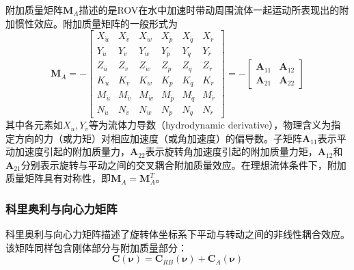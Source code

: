 附加质量矩阵$\boldsymbol{M}_A$描述的是ROV在水中加速时带动周围流体一起运动所表现出的附加惯性效应。附加质量矩阵的一般形式为
\begin{equation}
    \boldsymbol{M}_{A}=
    -\begin{bmatrix}
        X_{\dot{u}} & X_{\dot{v}} & X_{\dot{w}} & X_{\dot{p}} & X_{\dot{q}} & X_{\dot{r}} \\
        Y_{\dot{u}} & Y_{\dot{v}} & Y_{\dot{w}} & Y_{\dot{p}} & Y_{\dot{q}} & Y_{\dot{r}} \\
        Z_{\dot{u}} & Z_{\dot{v}} & Z_{\dot{w}} & Z_{\dot{p}} & Z_{\dot{q}} & Z_{\dot{r}} \\
        K_{\dot{u}} & K_{\dot{v}} & K_{\dot{w}} & K_{\dot{p}} & K_{\dot{q}} & K_{\dot{r}} \\
        M_{\dot{u}} & M_{\dot{v}} & M_{\dot{w}} & M_{\dot{p}} & M_{\dot{q}} & M_{\dot{r}} \\
        N_{\dot{u}} & N_{\dot{v}} & N_{\dot{w}} & N_{\dot{p}} & N_{\dot{q}} & N_{\dot{r}}
    \end{bmatrix}
    =
    -\begin{bmatrix}
        \boldsymbol{A}_{11} & \boldsymbol{A}_{12} \\
        \boldsymbol{A}_{21} & \boldsymbol{A}_{22}
    \end{bmatrix}
    \label{eq:M_A_full}
\end{equation}
其中各元素如$X_{\dot{u}},Y_{\dot{v}}$等为流体力导数（hydrodynamic derivative），物理含义为指定方向的力（或力矩）对相应加速度（或角加速度）的偏导数。子矩阵$\boldsymbol{A}_{11}$表示平动加速度引起的附加质量力，$\boldsymbol{A}_{22}$表示旋转角加速度引起的附加质量力矩，$\boldsymbol{A}_{12}$和$\boldsymbol{A}_{21}$分别表示旋转与平动之间的交叉耦合附加质量效应。在理想流体条件下，附加质量矩阵具有对称性，即$\boldsymbol{M}_A=\boldsymbol{M}_A^T$。

\subsubsection{科里奥利与向心力矩阵}

科里奥利与向心力矩阵描述了旋转体坐标系下平动与转动之间的非线性耦合效应。该矩阵同样包含刚体部分与附加质量部分：
\begin{equation}
    \boldsymbol{C}(\boldsymbol{\nu})=
    \boldsymbol{C}_{RB}(\boldsymbol{\nu})+
    \boldsymbol{C}_{A}(\boldsymbol{\nu})
\end{equation}

